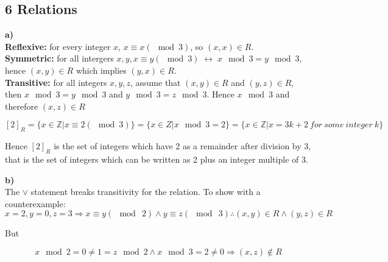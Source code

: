 \documentclass[12pt]{article}
\newcommand{\Z}{\mathbb{Z}}
\renewcommand{\iff}{\;\leftrightarrow\;}
\begin{document}
\subsection{6 Relations} 

\textbf{a)} \\

\textbf{Reflexive:} for every integer $x$, $x \equiv x (\mod 3)$, so $(x,x) \in R$. \\
\textbf{Symmetric:} for all intergers $x,y,x \equiv y (\mod 3) \iff x \mod 3 = y \mod 3$, hence $(x,y) \in R$ which implies $(y,x) \in R$. \\
\textbf{Transitive:} for all integers $x,y,z$, assume that $(x,y) \in R$ and $(y,z) \in R$, then $x \mod 3 = y \mod 3$ and $y \mod 3 = z \mod 3$. Hence $x \mod 3$ and therefore $(x,z) \in R$

$$
[2]_R = \{ x \in \Z | x \equiv 2 (\mod 3)\} = \{ x \in Z | x \mod 3 = 2\}
= \{ x \in \Z | x = 3k+2\ for\ some\ integer\ k\}
$$

Hence $[2]_R$ is the set of integers which have 2 as a remainder after division by 3, that is the set of integers which can be written as 2 plus an integer multiple of 3.

\textbf{b)} \\

The $\vee$ statement breaks transitivity for the relation. To show with a counterexample: \\

$$
x = 2, y = 0, z = 3 \Rightarrow x \equiv y (\mod\ 2) \wedge y \equiv z (\mod\ 3) \therefore (x,y) \in R \wedge (y,z) \in R
$$

But

$$
x \mod 2 = 0 \neq 1 = z \mod 2 \wedge x \mod 3 = 2 \neq 0 \Rightarrow (x,z) \notin R
$$
\end{document}
